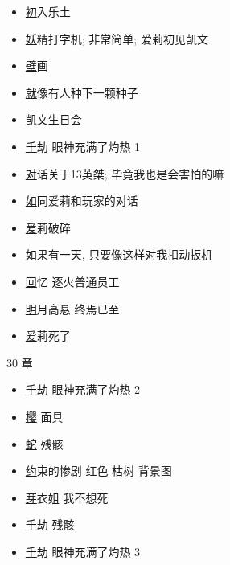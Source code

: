 \documentclass[a4paper]{article}
\begin{document}
\begin{itemize}
    \item \href{https://www.bilibili.com/video/BV15Y4y1872S/} 初入乐土
    \item \href{https://www.bilibili.com/video/BV15Y4y1872S/?t=4118} 妖精打字机; 非常简单; 爱莉初见凯文
    \item \href{https://www.bilibili.com/video/BV15Y4y1872S/?t=5141} 壁画
    \item \href{https://www.bilibili.com/video/BV15Y4y1872S/?p=4&t=1114} 就像有人种下一颗种子
    \item \href{https://www.bilibili.com/video/BV15Y4y1872S/?p=4&t=1675} 凯文生日会
    \item \href{https://www.bilibili.com/video/BV15Y4y1872S/?p=4&t=3315} 千劫 眼神充满了灼热 1
    \item \href{https://www.bilibili.com/video/BV15Y4y1872S/?p=4&t=3830} 对话关于13英桀; 毕竟我也是会害怕的嘛
    \item \href{https://www.bilibili.com/video/BV15Y4y1872S/?p=4&t=4235} 如同爱莉和玩家的对话
    \item \href{https://www.bilibili.com/video/BV15Y4y1872S/?p=4&t=5700} 爱莉破碎
    \item \href{https://www.bilibili.com/video/BV15Y4y1872S/?p=5} 如果有一天, 只要像这样对我扣动扳机
    \item \href{https://www.bilibili.com/video/BV15Y4y1872S/?p=5&t=321} 回忆 逐火普通员工
    \item \href{https://www.bilibili.com/video/BV15Y4y1872S/?p=5&t=812} 明月高悬 终焉已至
    \item \href{https://www.bilibili.com/video/BV15Y4y1872S/?p=5&t=1445} 爱莉死了
\end{itemize}

30 章

\begin{itemize}
    \item \href{https://www.bilibili.com/video/BV1gL4y1N7Yk/?t=5370} 千劫 眼神充满了灼热 2
    \item \href{https://www.bilibili.com/video/BV1gL4y1N7Yk/?t=6000} 樱 面具
    \item \href{https://www.bilibili.com/video/BV1gL4y1N7Yk/?p=3&t=1338} 蛇 残骸
    \item \href{https://www.bilibili.com/video/BV1gL4y1N7Yk/?p=3&t=2419} 约束的惨剧 红色 枯树 背景图
    \item \href{https://www.bilibili.com/video/BV1gL4y1N7Yk/?p=3&t=3830} 芽衣姐 我不想死
    \item \href{https://www.bilibili.com/video/BV1gL4y1N7Yk/?p=5&t=1850} 千劫 残骸
    \item \href{https://www.bilibili.com/video/BV1gL4y1N7Yk/?p=5&t=3389} 千劫 眼神充满了灼热 3
\end{itemize}
\end{document}
